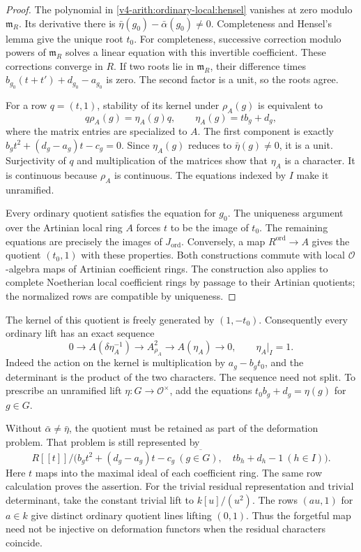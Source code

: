 \begin{proof}
The polynomial in \eqref{v4-arith:ordinary-local:hensel} vanishes at
zero modulo $\mathfrak m_R$. Its derivative there is
$\bar\eta(g_0)-\bar\alpha(g_0)\ne0$.
Completeness and Hensel's lemma give the unique root $t_0$.
For completeness, successive correction modulo powers of
$\mathfrak m_R$ solves a linear equation with this invertible
coefficient. These corrections converge in $R$.
If two roots lie in $\mathfrak m_R$, their difference times
$b_{g_0}(t+t')+d_{g_0}-a_{g_0}$ is zero. The second factor is a
unit, so the roots agree.

For a row $q=(t,1)$, stability of its kernel under $\rho_A(g)$
is equivalent to
\[
 q\rho_A(g)=\eta_A(g)q,\qquad
 \eta_A(g)=t b_g+d_g,
\]
where the matrix entries are specialized to $A$.
The first component is exactly
$b_gt^2+(d_g-a_g)t-c_g=0$.
Since $\eta_A(g)$ reduces to $\bar\eta(g)\ne0$, it is a unit.
Surjectivity of $q$ and multiplication of the matrices show that
$\eta_A$ is a character. It is continuous because $\rho_A$ is
continuous. The equations indexed by $I$ make it unramified.

Every ordinary quotient satisfies the equation for $g_0$.
The uniqueness argument over the Artinian local ring $A$ forces
$t$ to be the image of $t_0$.
The remaining equations are precisely the images of
$J_{\mathrm{ord}}$. Conversely, a map $R^{\mathrm{ord}}\to A$
gives the quotient $(t_0,1)$ with these properties.
Both constructions commute with local $\mathcal O$-algebra maps
of Artinian coefficient rings. The construction also applies to
complete Noetherian local coefficient rings by passage to their Artinian
quotients; the normalized rows are compatible by uniqueness.
\end{proof}

The kernel of this quotient is freely generated by $(1,-t_0)$.
Consequently every ordinary lift has an exact sequence
\begin{equation}
\label{v4-arith:ordinary-local:sequence}
 0\longrightarrow A(\delta\eta_A^{-1})
 \longrightarrow A^2_{\rho_A}
 \longrightarrow A(\eta_A)\longrightarrow0,
 \qquad \eta_A|_I=1.
\end{equation}
Indeed the action on the kernel is multiplication by
$a_g-b_gt_0$, and the determinant is the product of the two
characters. The sequence need not split.
To prescribe an unramified lift $\eta:G\to\mathcal O^\times$,
add the equations $t_0b_g+d_g=\eta(g)$ for $g\in G$.

\begin{remark}
Without $\bar\alpha\ne\bar\eta$, the quotient must be retained
as part of the deformation problem. That problem is still represented
by
\[
 R[[t]]\big/
 \overline{\bigl(
 b_gt^2+(d_g-a_g)t-c_g\ (g\in G),\quad
 tb_h+d_h-1\ (h\in I)
 \bigr)}.
\]
Here $t$ maps into the maximal ideal of each coefficient ring.
The same row calculation proves the assertion.
For the trivial residual representation and trivial determinant,
take the constant trivial lift to $k[u]/(u^2)$.
The rows $(a u,1)$ for $a\in k$ give distinct ordinary quotient
lines lifting $(0,1)$. Thus the forgetful map need not be injective
on deformation functors when the residual characters coincide.
\end{remark}

